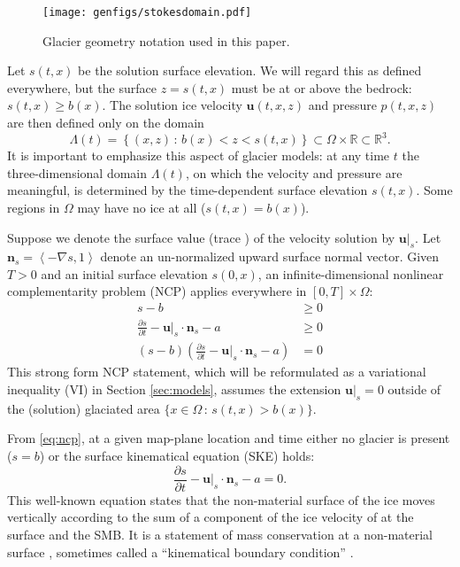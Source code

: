 \documentclass[hidelinks,onefignum,onetabnum,final]{siamart220329}  %
\newcommand{\RR}{\mathbb{R}}
\newcommand{\grad}{\nabla}
\newcommand{\bn}{\mathbf{n}}
\newcommand{\bu}{\mathbf{u}}
\begin{document}
\medskip
\begin{figure}[ht]
\centering
\texttt{[image: genfigs/stokesdomain.pdf]}
\caption{Glacier geometry notation used in this paper.}
\label{fig:stokesdomain}
\end{figure}

\medskip
Let $s(t,x)$ be the solution surface elevation.  We will regard this as defined everywhere, but the surface $z=s(t,x)$ must be at or above the bedrock: $s(t,x) \ge b(x)$.  The solution ice velocity $\bu(t,x,z)$ and pressure $p(t,x,z)$ are then defined only on the domain
\begin{equation}
\Lambda(t) = \left\{(x,z)\,:\,b(x) < z < s(t,x)\right\} \subset \Omega \times \RR \subset \RR^3. \label{eq:icydomain}
\end{equation}
It is important to emphasize this aspect of glacier models: at any time $t$ the three-dimensional domain $\Lambda(t)$, on which the velocity and pressure are meaningful, is determined by the time-dependent surface elevation $s(t,x)$.  Some regions in $\Omega$ may have no ice at all ($s(t,x)=b(x)$).

Suppose we denote the surface value (trace \cite{Evans2010}) of the velocity solution by $\bu|_s$.  Let $\bn_s = \left<-\grad s,1\right>$ denote an un-normalized upward surface normal vector.  Given $T>0$ and an initial surface elevation $s(0,x)$, an infinite-dimensional nonlinear complementarity problem (NCP) \cite{Bueler2021conservation,FacchineiPang2003,SchoofHewitt2013} applies everywhere in $[0,T]\times \Omega$:
\begin{subequations}
\label{eq:ncp}
\begin{align}
s - b &\ge 0 \\
\frac{\partial s}{\partial t} - \bu|_s \cdot \bn_s - a &\ge 0 \\
(s - b) \left(\frac{\partial s}{\partial t} - \bu|_s \cdot \bn_s - a\right) &= 0
\end{align}
\end{subequations}
This strong form NCP statement, which will be reformulated as a variational inequality (VI) \cite{KinderlehrerStampacchia1980} in Section \ref{sec:models}, assumes the extension $\bu|_s=0$ outside of the (solution) glaciated area $\{x\in\Omega\,:\,s(t,x)>b(x)\}$.

From \eqref{eq:ncp}, at a given map-plane location and time either no glacier is present ($s=b$) or the surface kinematical equation (SKE) holds:
\begin{equation}
\frac{\partial s}{\partial t} - \bu|_s \cdot \bn_s - a = 0.  \label{eq:ske}
\end{equation}
This well-known equation \cite{SchoofHewitt2013} states that the non-material surface of the ice moves vertically according to the sum of a component of the ice velocity of at the surface and the SMB.  It is a statement of mass conservation at a non-material surface \cite{Aschwandenetal2012}, sometimes called a ``kinematical boundary condition'' \cite{GreveBlatter2009}.
\end{document}
